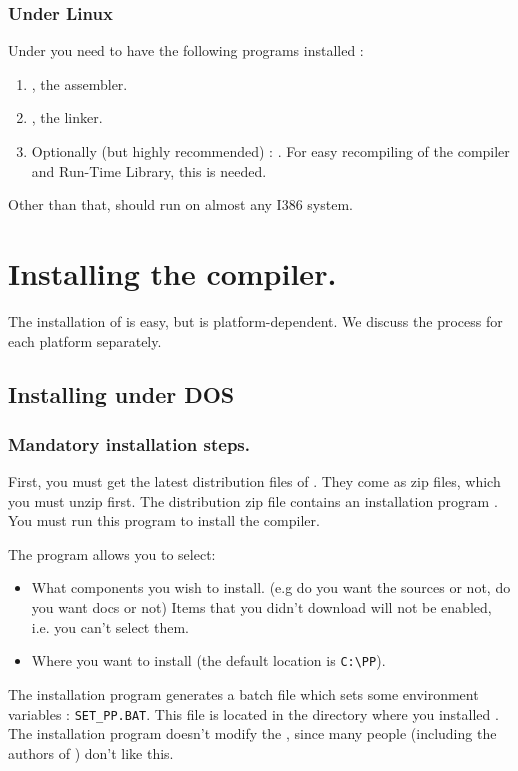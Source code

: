 \documentclass{report}
\begin{document}
\subsubsection{Under Linux}
Under \linux you need to have the following programs installed :
\begin{enumerate}
\item \gnu {}, the \gnu assembler.
\item \gnu {}, the \gnu linker.
\item Optionally (but highly recommended) : \gnu {}. For easy
recompiling of the compiler and Run-Time Library, this is needed.
\end{enumerate}
Other than that, \fpc should run on almost any I386 \linux system.

\section{Installing the compiler.}
The installation of \fpc is easy, but is platform-dependent.
We discuss the process for each platform separately.


%
%

\subsection{Installing under DOS}
\subsubsection{Mandatory installation steps.}
First, you must get the latest distribution files of \fpc. They come as zip
files, which you must unzip first. The distribution zip file contains an
installation program . You must run this program to install
the compiler. 


The program allows you to select:
\begin{itemize}
\item What components you wish to install. (e.g do you want the sources or
not, do you want docs or not) Items that you didn't download will not
be enabled, i.e. you can't select them.

\item Where you want to install (the default location is \verb|C:\PP|).
\end{itemize}
The installation program generates a batch file which sets some environment
variables : \verb|SET_PP.BAT|. This file is located in the directory where
you installed \fpc. The installation program doesn't modify the 
, since many people (including the authors of \fpc) 
don't like this.
\end{document}
